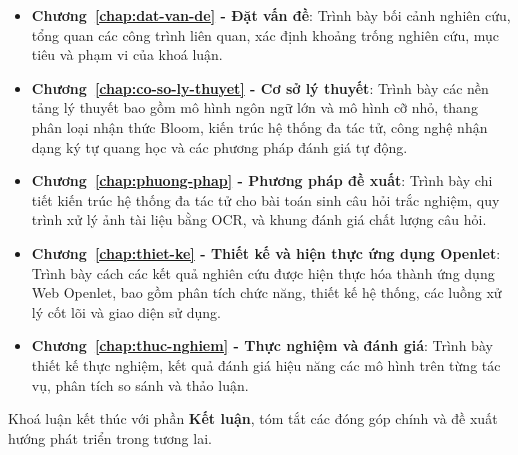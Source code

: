 \begin{itemize}
    \item \textbf{Chương~\ref{chap:dat-van-de} - Đặt vấn đề}: Trình bày bối cảnh nghiên cứu, tổng quan các công trình liên quan, xác định khoảng trống nghiên cứu, mục tiêu và phạm vi của khoá luận.
    \item \textbf{Chương~\ref{chap:co-so-ly-thuyet} - Cơ sở lý thuyết}: Trình bày các nền tảng lý thuyết bao gồm mô hình ngôn ngữ lớn và mô hình cỡ nhỏ, thang phân loại nhận thức Bloom, kiến trúc hệ thống đa tác tử, công nghệ nhận dạng ký tự quang học và các phương pháp đánh giá tự động.
    \item \textbf{Chương~\ref{chap:phuong-phap} - Phương pháp đề xuất}: Trình bày chi tiết kiến trúc hệ thống đa tác tử cho bài toán sinh câu hỏi trắc nghiệm, quy trình xử lý ảnh tài liệu bằng OCR, và khung đánh giá chất lượng câu hỏi.
    \item \textbf{Chương~\ref{chap:thiet-ke} - Thiết kế và hiện thực ứng dụng Openlet}: Trình bày cách các kết quả nghiên cứu được hiện thực hóa thành ứng dụng Web Openlet, bao gồm phân tích chức năng, thiết kế hệ thống, các luồng xử lý cốt lõi và giao diện sử dụng.
    \item \textbf{Chương~\ref{chap:thuc-nghiem} - Thực nghiệm và đánh giá}: Trình bày thiết kế thực nghiệm, kết quả đánh giá hiệu năng các mô hình trên từng tác vụ, phân tích so sánh và thảo luận.
\end{itemize}

Khoá luận kết thúc với phần \textbf{Kết luận}, tóm tắt các đóng góp chính và đề xuất hướng phát triển trong tương lai.
